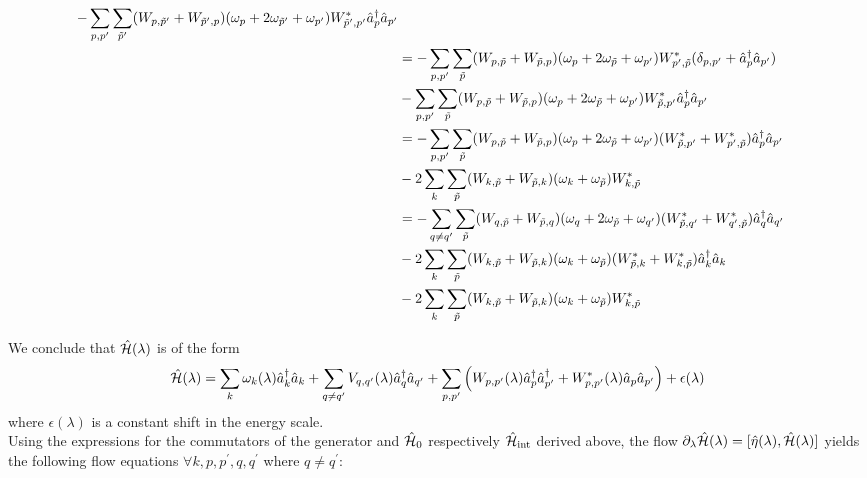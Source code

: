 \begin{appendix}
\begin{itemize}
\begin{align}
-\sum\limits_{p,p^\prime}\sum\limits_{\tilde p^\prime}(W_{p,\tilde p^\prime}+W_{\tilde p^\prime,p})(\omega_p+2\omega_{\tilde p^\prime}+\omega_{ p^\prime})W_{\tilde p^\prime, p^\prime}^*\hat a^\dagger_p\hat a_{ p^\prime}\nonumber \\ \quad& 
=-\sum\limits_{p,p^\prime}\sum\limits_{\tilde p}(W_{p,\tilde p}+W_{\tilde p,p})(\omega_p+2\omega_{\tilde p}+\omega_{p^\prime})W_{p^\prime,\tilde p}^*(\delta_{p,p^\prime}+\hat a^\dagger_p\nonumber\hat a_{p^\prime}) \\ \quad& 
-\sum\limits_{p,p^\prime}\sum\limits_{\tilde p}(W_{p,\tilde p}+W_{\tilde p,p})(\omega_p+2\omega_{\tilde p}+\omega_{ p^\prime})W_{\tilde p, p^\prime}^*\hat a^\dagger_p\hat a_{ p^\prime}\nonumber \\ \quad& 
= -\sum\limits_{p,p^\prime}\sum\limits_{\tilde p}(W_{p,\tilde p}+W_{\tilde p,p})(\omega_p+2\omega_{\tilde p}+\omega_{ p^\prime})(W_{\tilde p, p^\prime}^*+W_{p^\prime,\tilde p}^*)\hat a^\dagger_p\hat a_{ p^\prime}\nonumber \\ \quad& 
-2\sum\limits_{k}\sum\limits_{\tilde p}(W_{k,\tilde p}+W_{\tilde p,k})(\omega_k+\omega_{\tilde p})W_{k,\tilde p}^*\nonumber \\ \quad& 
= -\sum\limits_{q\neq q^\prime}\sum\limits_{\tilde p}(W_{q,\tilde p}+W_{\tilde p,q})(\omega_q+2\omega_{\tilde p}+\omega_{ q^\prime})(W_{\tilde p, q^\prime}^*+W_{q^\prime,\tilde p}^*)\hat a^\dagger_q\hat a_{ q^\prime}\nonumber \\ \quad& 
-2\sum\limits_{k}\sum\limits_{\tilde p}(W_{k,\tilde p}+W_{\tilde p,k})(\omega_k+\omega_{\tilde p})(W_{\tilde p, k}^*+W_{k,\tilde p}^*)\hat a^\dagger_k\hat a_{ k}\nonumber \\ \quad& 
-2\sum\limits_{k}\sum\limits_{\tilde p}(W_{k,\tilde p}+W_{\tilde p,k})(\omega_k+\omega_{\tilde p})W_{k,\tilde p}^*
\end{align}
\end{itemize}
We conclude that $\hat{\mathcal{H}}(\lambda)$ is of the form 
\begin{align}\label{Flow_Hamiltonian_for_purely_quadratic_case}
\hat{\mathcal{H}}(\lambda)=\sum\limits_k \omega_k(\lambda) \hat a^\dagger_k\hat a_k+\sum\limits_{q\neq q^\prime}V_{q,q^\prime}(\lambda)\hat a^\dagger_q\hat a_{q^\prime}+\sum\limits_{p,p^\prime}\left(W_{p,p^\prime}(\lambda)\hat a^\dagger_p\hat a^\dagger_{p^\prime}+W_{p,p^\prime}^*(\lambda)\hat a_p\hat a_{p^\prime}\right)+\epsilon(\lambda)
\end{align}
where $\epsilon(\lambda)$ is a constant shift in the energy scale.\\
Using the expressions for the commutators of the generator and $\hat{\mathcal{H}}_0$ respectively $\hat{\mathcal{H}}_{\mathrm{int}}$ derived above, the flow $\partial_\lambda\hat{\mathcal{H}}(\lambda)=[\hat\eta(\lambda),\hat{\mathcal{H}}(\lambda)]$ yields the following flow equations $\forall k, p,p^\prime, q, q^\prime$ where $q\neq q^\prime$:

\end{appendix}
